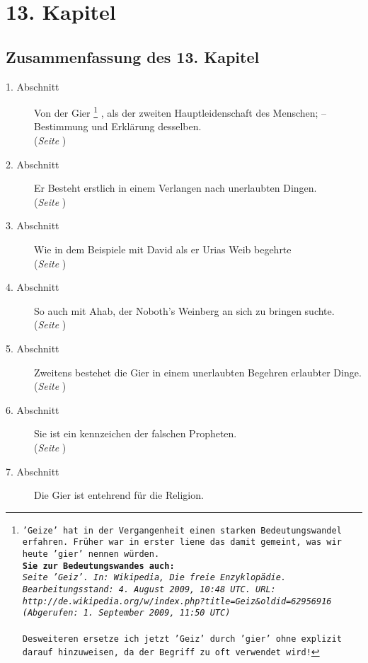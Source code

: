 
\chapter{13. Kapitel} \label{kap13}

\section{Zusammenfassung des 13. Kapitel}
\footnotesize
\begin{description}
\item[1. Abschnitt]  Von der Gier
\footnote{\texttt{'Geize' hat in der Vergangenheit einen starken Bedeutungswandel erfahren. Früher war in erster liene das damit gemeint, was wir heute 'gier' nennen würden.
\\ \textbf{Sie zur Bedeutungswandes auch:}
\\ \textit{Seite 'Geiz'. In: Wikipedia, Die freie Enzyklopädie. Bearbeitungsstand: 4. August 2009, 10:48 UTC. URL:
\\ http://de.wikipedia.org/w/index.php?title=Geiz\&oldid=62956916
\\ (Abgerufen: 1. September 2009, 11:50 UTC) }
\\ \\ Desweiteren ersetze ich jetzt 'Geiz' durch 'gier' ohne explizit darauf hinzuweisen, da der Begriff zu oft verwendet wird!}}
, als der zweiten Hauptleidenschaft des Menschen;
-- Bestimmung und Erklärung desselben.
\\(\textit{Seite \pageref{kap13_ab1}})
\item[2. Abschnitt] Er Besteht erstlich in einem Verlangen nach unerlaubten
Dingen.
\\(\textit{Seite \pageref{kap13_ab2}})
\item[3. Abschnitt] Wie in dem Beispiele mit David als er Urias Weib begehrte
\\(\textit{Seite \pageref{kap13_ab3}})
\item[4. Abschnitt] So auch mit Ahab, der Noboth's Weinberg an sich zu bringen
suchte.
\\(\textit{Seite \pageref{kap13_ab4}})
\item[5. Abschnitt] Zweitens bestehet die Gier in einem unerlaubten Begehren
erlaubter Dinge.
\\(\textit{Seite \pageref{kap13_ab5}})
\item[6. Abschnitt] Sie ist ein kennzeichen der falschen Propheten.
\\(\textit{Seite \pageref{kap13_ab6}})
\item[7. Abschnitt] Die Gier ist entehrend für die Religion.

\end{description}
